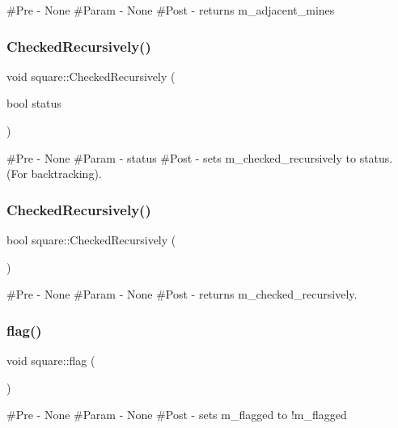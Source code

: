 \#\+Pre -\/ None \#\+Param -\/ None \#\+Post -\/ returns m\+\_\+adjacent\+\_\+mines \mbox{\label{classsquare_a0a16171bace3d7e23c4b40bad476f32a}} 
\subsubsection{\texorpdfstring{CheckedRecursively()}{CheckedRecursively()}\hspace{0.1cm}{\footnotesize\ttfamily [1/2]}}
{\footnotesize\ttfamily void square\+::\+Checked\+Recursively (\begin{DoxyParamCaption}\item[{bool}]{status }\end{DoxyParamCaption})}

\#\+Pre -\/ None \#\+Param -\/ status \#\+Post -\/ sets m\+\_\+checked\+\_\+recursively to status. (For backtracking). \mbox{\label{classsquare_acb16014b1e47b12b5f8e982d2c5a33f9}} 
\subsubsection{\texorpdfstring{CheckedRecursively()}{CheckedRecursively()}\hspace{0.1cm}{\footnotesize\ttfamily [2/2]}}
{\footnotesize\ttfamily bool square\+::\+Checked\+Recursively (\begin{DoxyParamCaption}{ }\end{DoxyParamCaption})}

\#\+Pre -\/ None \#\+Param -\/ None \#\+Post -\/ returns m\+\_\+checked\+\_\+recursively. \mbox{\label{classsquare_abace20e896650bde44fedfa7a1535d33}} 
\subsubsection{\texorpdfstring{flag()}{flag()}}
{\footnotesize\ttfamily void square\+::flag (\begin{DoxyParamCaption}{ }\end{DoxyParamCaption})}

\#\+Pre -\/ None \#\+Param -\/ None \#\+Post -\/ sets m\+\_\+flagged to !m\+\_\+flagged \mbox{\label{classsquare_a9061ee58195323e1d2c63d5ee4ef69d7}} 
